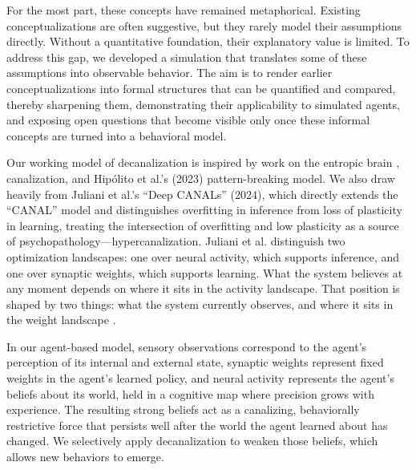 \documentclass[12pt,fleqn]{article}
\begin{document}
For the most part, these concepts have remained metaphorical. Existing conceptualizations are often suggestive, but they rarely model their assumptions directly. Without a quantitative foundation, their explanatory value is limited. To address this gap, we developed a simulation that translates some of these assumptions into observable behavior. The aim is to render earlier conceptualizations into formal structures that can be quantified and compared, thereby sharpening them, demonstrating their applicability to simulated agents, and exposing open questions that become visible only once these informal concepts are turned into a behavioral model.

Our working model of decanalization is inspired by work on the entropic brain \citep{carhart-harris_entropic_2014,carhart-harris_entropic_2018}, canalization, and Hipólito et al.'s (2023) pattern-breaking model. We also draw heavily from Juliani et al.'s ``Deep CANALs'' (2024), which directly extends the ``CANAL'' model \citep{carhart-harris_canalization_2023} and distinguishes overfitting in inference from loss of plasticity in learning, treating the intersection of overfitting and low plasticity as a source of psychopathology---hypercanalization. Juliani et al. distinguish two optimization landscapes: one over neural activity, which supports inference, and one over synaptic weights, which supports learning. What the system believes at any moment depends on where it sits in the activity landscape. That position is shaped by two things: what the system currently observes, and where it sits in the weight landscape \citep[][``Two Canalizations'' section, para.~7]{juliani_deep_2024}. 

In our agent-based model, sensory observations correspond to the agent's perception of its internal and external state, synaptic weights represent fixed weights in the agent's learned policy, and neural activity represents the agent's beliefs about its world, held in a cognitive map where precision grows with experience. The resulting strong beliefs act as a canalizing, behaviorally restrictive force that persists well after the world the agent learned about has changed. We selectively apply decanalization to weaken those beliefs, which allows new behaviors to emerge.
\end{document}
